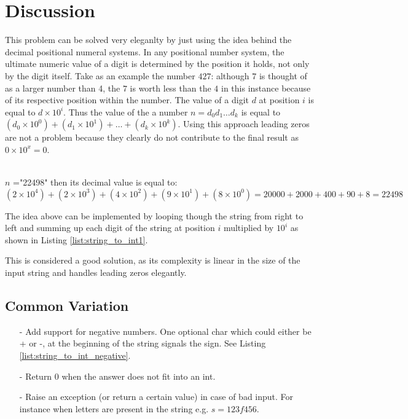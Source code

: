 \section{Discussion}
\label{string_to_int:sec:discussion}
This problem can be solved very eleganlty by just using the idea behind the decimal positional numeral systems.
In any positional number system, the ultimate numeric value of a digit is determined by the position it holds, not only by the digit itself. Take as an example the number $427$:  although $7$ is thought of as a larger number than 4, the $7$ is worth less than the $4$ in this instance because of its respective position within the number. The value of a digit $d$ at position $i$ is equal to $d\times 10^i$. Thus the value of the a number $n=d_0d_1 \ldots d_k$ is equal to $(d_0 \times 10^0) + (d_1 \times 10^1) + \ldots + (d_k \times 10^k)$.
Using this approach leading zeros are not a problem because they clearly do not contribute to the final result as $0 \times 10^x = 0$.
\begin{example}
	\hfill \\
	 $n$ ="22498" then its decimal value is equal to: $(2 \times 10^4) + (2 \times 10^3) + (4 \times 10^2) + (9 \times 10^1) + (8 \times 10^0) = 20000 + 2000 + 400 +90 +8 = 22498$
\end{example}

The idea above can be implemented by looping though the string from right to left and summing up each digit of the string at position $i$  multiplied by $10^i$ as shown in Listing \ref{list:string_to_int1}.




This is considered a good solution, as its complexity is linear in the size of the input string and handles leading zeros elegantly.

\subsection{Common Variation}
\begin{itemize}
	\item[-] Add support for negative numbers. One optional char which could either be + or -, at the beginning of the string  signals the sign. See Listing \ref{list:string_to_int_negative}.
	\item[-] Return $0$ when the answer does not fit into an int.
	\item[-] Raise an exception (or return a certain value) in case of bad input. For instance when letters are present in the string e.g. $s=123f456$.  
\end{itemize}

